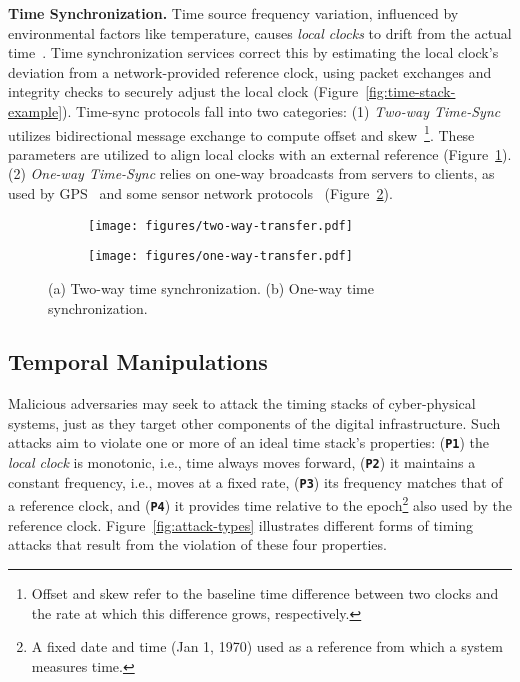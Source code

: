 \noindent\textbf{Time Synchronization.} Time source frequency variation, influenced by environmental factors like temperature, causes \textit{local clocks} to drift from the actual time~\cite{graham-clock-sync}. Time synchronization services correct this by estimating the local clock's deviation from a network-provided reference clock, using packet exchanges and integrity checks to securely adjust the local clock (Figure~\ref{fig:time-stack-example}). Time-sync protocols fall into two categories: (1) \textit{Two-way Time-Sync} utilizes bidirectional message exchange to compute offset and skew~\footnote{Offset and skew refer to the baseline time difference between two clocks and the rate at which this difference grows, respectively.}. These parameters are utilized to align local clocks with an external reference (Figure~\ref{fig:two-way}).(2)  \textit{One-way Time-Sync} relies on one-way broadcasts from servers to clients, as used by GPS~\cite{gps-spoofing-fundamentals} and some sensor network protocols~\cite{Elson2003RBS} (Figure~\ref{fig:one-way}).

\begin{figure}[t]
    \centering
    \begin{subfigure}{0.28\columnwidth}
        \centering   
     \texttt{[image: figures/two-way-transfer.pdf]}
        \caption{}
        \label{fig:two-way}
    \end{subfigure}
    \hspace{2em}
    \begin{subfigure}{0.35\columnwidth}
        \centering 
    \texttt{[image: figures/one-way-transfer.pdf]}
        \caption{}
        \label{fig:one-way}
    \end{subfigure}
    \caption{(a) Two-way time synchronization. (b) One-way time synchronization.}
    \label{fig:sync-paradigms}
\end{figure}

\subsection{Temporal Manipulations}\label{subsec:attack-types}
Malicious adversaries may seek to attack the timing stacks of cyber-physical systems, just as they target other components of the digital infrastructure. Such attacks aim to violate one or more of an ideal time stack's properties: 
(\textbf{\texttt{P1}}) the \textit{local clock} is monotonic, i.e., time always moves forward, (\textbf{\texttt{P2}}) it maintains a constant frequency, i.e., moves at a fixed rate, (\textbf{\texttt{P3}}) its frequency matches that of a reference clock, and (\textbf{\texttt{P4}}) it provides time relative to the epoch\footnote{A fixed date and time (Jan 1, 1970) used as a reference from which a system measures time.} also used by the reference clock. Figure~\ref{fig:attack-types} illustrates different forms of timing attacks that result from the violation of these four properties.

